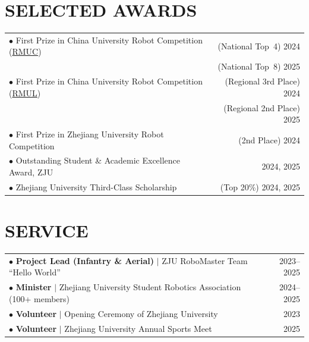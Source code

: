 \documentclass[a4paper,11pt]{article}
\begin{document}
\vspace{6pt}
\section{SELECTED AWARDS}
\begin{tabularx}{\linewidth}{@{}X r@{}}
$\bullet$ First Prize in China University Robot Competition (\href{https://www.robomaster.com/en-US/robo/rm?djifrom=rmu1}{RMUC}) & (National Top~4) 2024 \\
& (National Top~8) 2025 \\[3.75pt]
$\bullet$ First Prize in China University Robot Competition (\href{https://www.robomaster.com/en-US/robo/college-league?djifrom=rmu1}{RMUL}) & (Regional 3rd Place) 2024 \\
& (Regional 2nd Place) 2025 \\[3.75pt]
$\bullet$ First Prize in Zhejiang University Robot Competition & (2nd Place) 2024 \\[3.75pt]
$\bullet$ Outstanding Student \& Academic Excellence Award, ZJU & 2024, 2025 \\[3.75pt]
$\bullet$ Zhejiang University Third-Class Scholarship & (Top 20\%) 2024, 2025 \\
\end{tabularx}

\section{SERVICE}
\begin{tabularx}{\linewidth}{@{}X r@{}}
$\bullet$ \textbf{Project Lead (Infantry \& Aerial)} $|$ ZJU RoboMaster Team ``Hello World'' & 2023--2025 \\[3.75pt]
$\bullet$ \textbf{Minister} $|$ Zhejiang University Student Robotics Association (100+ members) & 2024--2025 \\[3.75pt]
$\bullet$ \textbf{Volunteer} $|$ Opening Ceremony of Zhejiang University & 2023 \\[3.75pt]
$\bullet$ \textbf{Volunteer} $|$ Zhejiang University Annual Sports Meet & 2025 \\
\end{tabularx}
\end{document}
